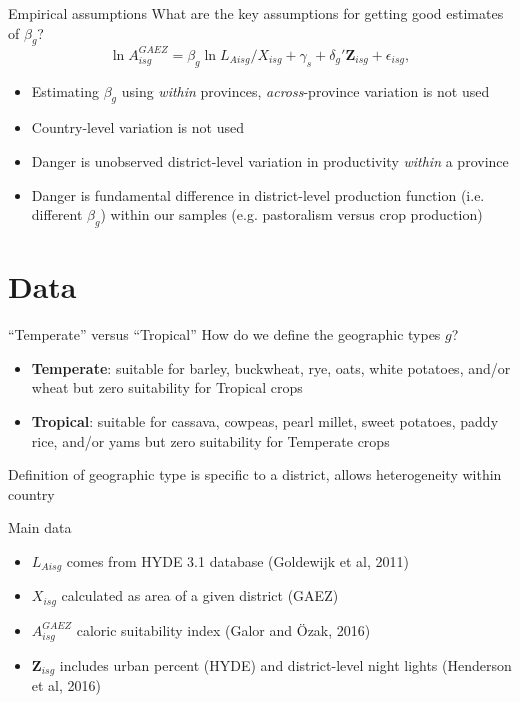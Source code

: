 \documentclass[10pt, xcolor=dvipsnames]{beamer}
\begin{document}
\begin{frame}{Empirical assumptions}
What are the key assumptions for getting good estimates of $\beta_g$?
\begin{equation}
  \ln A^{GAEZ}_{isg} = \beta_g \ln L_{Aisg}/X_{isg} + \gamma_{s} + \delta_g' \mathbf{Z}_{isg} + \epsilon_{isg}, \label{EQ_regress}
\end{equation}

\begin{itemize}
  \item Estimating $\beta_g$ using \textit{within} provinces, \textit{across}-province variation is not used
  \item Country-level variation is not used
  \item Danger is unobserved district-level variation in productivity \textit{within} a province
  \item Danger is fundamental difference in district-level production function (i.e. different $\beta_g$) within our samples (e.g. pastoralism versus crop production)
\end{itemize}
\end{frame}

\section{Data}

\begin{frame}{``Temperate'' versus ``Tropical''}
How do we define the geographic types $g$?
\begin{itemize}
  \item \textbf{Temperate}: suitable for barley, buckwheat, rye, oats, white potatoes, and/or wheat but zero suitability for Tropical crops
  \item \textbf{Tropical}: suitable for cassava, cowpeas, pearl millet, sweet potatoes, paddy rice, and/or yams but zero suitability for Temperate crops
\end{itemize}

Definition of geographic type is specific to a district, allows heterogeneity within country
\end{frame}

\begin{frame}{Main data}
\begin{itemize}
  \item $L_{Aisg}$ comes from HYDE 3.1 database (Goldewijk et al, 2011)
  \item $X_{isg}$ calculated as area of a given district (GAEZ)
  \item $A^{GAEZ}_{isg}$ caloric suitability index (Galor and {\"O}zak, 2016)
  \item $\mathbf{Z}_{isg}$ includes urban percent (HYDE) and district-level night lights (Henderson et al, 2016)
\end{itemize}

\hfill \hyperlink{stats}{}

\hfill \hyperlink{crops}{}
\end{frame}
\end{document}
